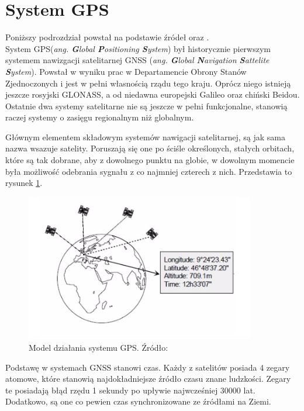 \section{System GPS}
\label{GPS}

Poniższy podrozdział powstał na podstawie źródeł \cite{GPS_ublox} oraz \cite{inzynierka}.\\



System GPS(\textit{ang. \textbf{G}lobal \textbf{P}ositioning \textbf{S}ystem}) był historycznie pierwszym systemem nawizgacji satelitarnej GNSS (\textit{ang. \textbf{G}lobal \textbf{N}avigation \textbf{S}attelite \textbf{S}ystem}). Powstał w wyniku prac w Departamencie Obrony Stanów Zjednoczonych i jest w pełni własnością rządu tego kraju. Oprócz niego istnieją jeszcze rosyjski GLONASS, a od niedawna europejski Galileo oraz chiński Beidou. Ostatnie dwa systemy satelitarne nie są jeszcze w pełni funkcjonalne, stanowią raczej systemy o zasięgu regionalnym niż globalnym.

Głównym elementem składowym systemów nawigacji satelitarnej, są jak sama nazwa wsazuje satelity. Poruszają się one po ściśle określonych, stałych orbitach, które są tak dobrane, aby z dowolnego punktu na globie, w dowolnym momencie była możliwość odebrania sygnału z co najmniej czterech z nich. Przedstawia to rysunek \ref{fig:image_gps_basics}.

\begin{figure}[H]
	\centering
	\includegraphics[width=10cm]{img/theory/GPS/gps_introduction.png}
	\caption{Model działania systemu GPS. Źródło: \cite{GPS_ublox}}
	\label{fig:image_gps_basics}
\end{figure}

Podstawę w systemach GNSS stanowi czas. Każdy z satelitów posiada 4 zegary atomowe, które stanowią najdokładniejsze źródło czasu znane ludzkości. Zegary te posiadają błąd rzędu 1 sekundy po upływie najwcześniej 30000 lat. Dodatkowo, są one co pewien czas synchronizowane ze źródłami na Ziemi.

